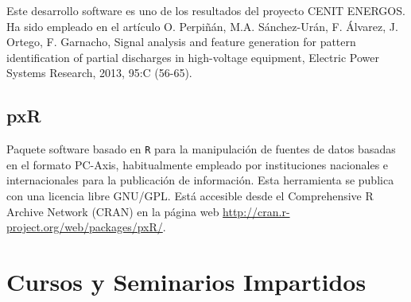 \documentclass[article, a4paper]{memoir}
\begin{document}
Este desarrollo software es uno de los resultados del proyecto CENIT ENERGOS. Ha sido empleado en el artículo O. Perpiñán,
M.A. Sánchez-Urán, F. Álvarez, J. Ortego, F. Garnacho, Signal analysis and feature generation for pattern identification of
partial discharges in high-voltage equipment, Electric Power Systems Research, 2013, 95:C (56-65).

\subsection{pxR}
\label{sec-10-6}
Paquete software basado en \texttt{R} para la manipulación de fuentes de datos basadas en el formato PC-Axis, habitualmente empleado por instituciones nacionales e internacionales para la publicación de información.  Esta herramienta se publica con una licencia libre GNU/GPL. Está accesible desde el Comprehensive R Archive Network (CRAN) en la página web \url{http://cran.r-project.org/web/packages/pxR/}.

\section{Cursos y Seminarios Impartidos}
\label{sec-11}
\end{document}
